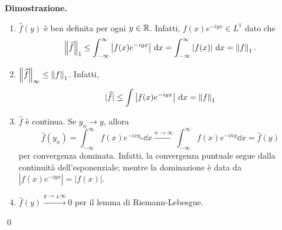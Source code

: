 \textbf{Dimostrazione.} 
\begin{enumerate}

	\item $\hat{f}(y)$ è ben definita per ogni $y \in \mathbb R$. Infatti, $f(x) e^{-iyx} \in L^1$ dato che
	$$
		\left\lVert \widehat{f} \right\rVert_1 \leq \int_{-\infty}^\infty \left| f(x) e^{-iyx} \right| \,\mathrm{d} x 
		= \int_{-\infty}^\infty \left| f(x) \right| \,\mathrm{d} x
		= \left\lVert f \right\rVert_1.
	$$


	\item $\left\lVert \widehat{f} \right\rVert_\infty \leq \left\lVert f \right\rVert_1$. Infatti,
	$$
		|\widehat{f}| \leq \int \left| f(x) e^{-iyx} \right| \,\mathrm{d} x = \left\lVert f \right\rVert_1
	$$


	\item $\hat{f}$ è continua. Se $y_n \to y$, allora
	$$
		\hat{f}(y_n) = \int_{-\infty}^\infty f(x) e^{-ixy_n} \dd x \xrightarrow{n \to \infty}
		\int_{-\infty}^\infty f(x) e^{-iny} \dd x = \hat{f}(y)
	$$
	per convergenza dominata. Infatti, la convergenza puntuale segue dalla continuità dell'esponenziale; mentre la dominazione è data da $|f(x) e^{-iyx}| = |f(x)|$.


	\item $\hat{f}(y) \xrightarrow{y \to \pm \infty} 0$ per il lemma di Riemann-Lebesgue.

\end{enumerate}
\qed

